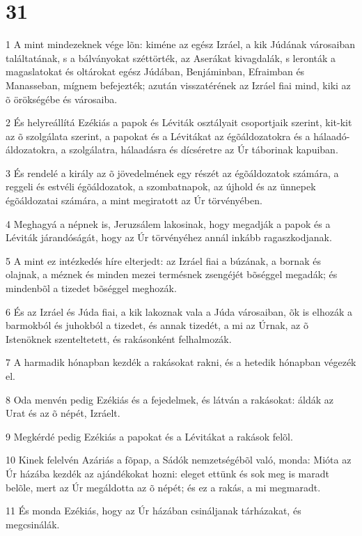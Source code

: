 \chapter{31}

\par 1 A mint mindezeknek vége lõn: kiméne az egész Izráel, a kik Júdának városaiban találtatának, s a bálványokat széttörték, az Aserákat kivagdalák, s leronták a magaslatokat és oltárokat egész Júdában, Benjáminban, Efraimban és Manasseban, mígnem befejezték; azután visszatérének az Izráel fiai mind, kiki az õ örökségébe és városaiba.
\par 2 És helyreállítá Ezékiás a papok és Léviták osztályait csoportjaik szerint, kit-kit az õ szolgálata szerint, a papokat és a Lévitákat az égõáldozatokra és a hálaadó-áldozatokra, a szolgálatra, hálaadásra és dícséretre az Úr táborinak kapuiban.
\par 3 És rendelé a király az õ jövedelmének egy részét az égõáldozatok számára, a reggeli és estvéli égõáldozatok, a szombatnapok, az újhold és az ünnepek égõáldozatai számára, a mint megiratott az Úr törvényében.
\par 4 Meghagyá a népnek is, Jeruzsálem lakosinak, hogy megadják a papok és a Léviták járandóságát, hogy az Úr törvényéhez annál inkább ragaszkodjanak.
\par 5 A mint ez intézkedés híre elterjedt: az Izráel fiai a búzának, a bornak és olajnak, a méznek és minden mezei termésnek zsengéjét bõséggel megadák; és mindenbõl a tizedet bõséggel meghozák.
\par 6 És az Izráel és Júda fiai, a kik lakoznak vala a Júda városaiban, õk is elhozák a barmokból és juhokból a tizedet, és annak tizedét, a mi az Úrnak, az õ Istenöknek szenteltetett, és rakásonként felhalmozák.
\par 7 A harmadik hónapban kezdék a rakásokat rakni, és a hetedik hónapban végezék el.
\par 8 Oda menvén pedig Ezékiás és a fejedelmek, és látván a rakásokat: áldák az Urat és az õ népét, Izráelt.
\par 9 Megkérdé pedig Ezékiás a papokat és a Lévitákat a rakások felõl.
\par 10 Kinek felelvén Azáriás a fõpap, a Sádók nemzetségébõl való, monda: Mióta az Úr házába kezdék az ajándékokat hozni: eleget ettünk és sok meg is maradt belõle, mert az Úr megáldotta az õ népét; és ez a rakás, a mi megmaradt.
\par 11 És monda Ezékiás, hogy az Úr házában csináljanak tárházakat, és megcsinálák.
